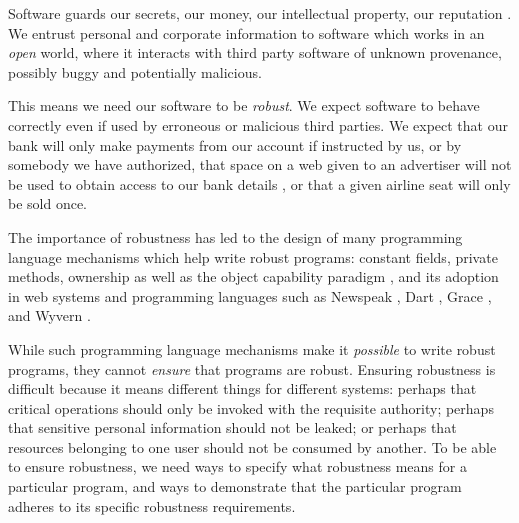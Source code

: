 Software guards our secrets, our money, our intellectual property,
our reputation \cite{covern}.  We entrust personal and
corporate information to software which works in an \emph{open} world, 
where  it interacts with %
third party software of unknown provenance, possibly buggy and potentially malicious.

This means we need our software to be \emph{robust}.
We expect software to behave correctly even if  used 
by erroneous or malicious third parties.
 We expect that our bank will only make payments 
from our account if instructed by us, or by somebody we have authorized, 
that space on a web given to an advertiser will not be used
to obtain access to our bank details \cite{cwe}, or that a given
airline seat will only be sold once. 

The importance of robustness has led to the design of many programming
language mechanisms which help write robust programs:
constant fields, private methods, ownership \cite{ownalias}
as well as the object capability paradigm \cite{MillerPhD},
and its adoption in  web systems
\cite{CapJavaHayesAPLAS17,CapNetSocc17Eide,DOCaT14} and programming languages such as Newspeak
\cite{newspeak17}, Dart \cite{dart15},
Grace \cite{grace,graceClasses}, and Wyvern \cite{wyverncapabilities}.

While such programming language mechanisms make it \textit{possible} to write robust
programs, they cannot \textit{ensure} that programs are robust.
Ensuring robustness is difficult because it means 
different things for different systems: perhaps
that critical operations should only be invoked with the requisite authority;
perhaps that sensitive personal information should not be leaked; 
or perhaps that resources belonging to one user should not be consumed by another.
%
To be able to ensure robustness, we need ways to specify what robustness means for a 
particular program, and ways to demonstrate that the particular program 
adheres to its specific robustness requirements.

